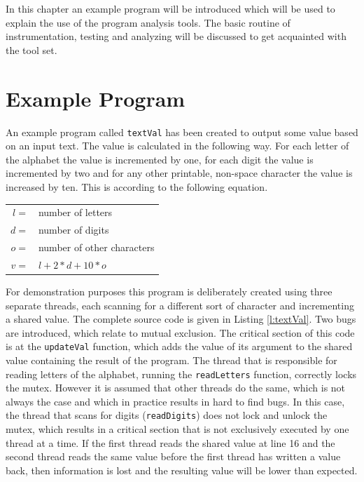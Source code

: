 
In this chapter an example program will be introduced
which will be used to explain the use of the program analysis tools.
The basic routine of instrumentation, testing and analyzing will be discussed
to get acquainted with the tool set.


\section{Example Program}
\label{s:exampleProgram}

An example program called \verb|textVal| has been created to output some value based on an input text.
The value is calculated in the following way. 
For each letter of the alphabet the value is incremented by one,
for each digit the value is incremented by two
and for any other printable, non-space character the value is increased by ten.
This is according to the following equation.
\begin{center}
\begin{tabular}{rl}
$l =$ & number of letters  \\
$d =$ & number of digits \\
$o =$ & number of other characters \\
$v =$ & $ l + 2*d + 10*o $ \\
\end{tabular}
\end{center}

For demonstration purposes this program is deliberately created using three separate threads,
each scanning for a different sort of character and incrementing a shared value.
The complete source code is given in Listing \ref{l:textVal}.
Two bugs are introduced, which relate to mutual exclusion.
The critical section of this code is at the \verb|updateVal| function,
which adds the value of its argument to the shared value containing the result of the program.
The thread that is responsible for reading letters of the alphabet,
running the \verb|readLetters| function,
correctly locks the mutex.
However it is assumed that other threads do the same,
which is not always the case and which in practice results in hard to find bugs.
In this case, the thread that scans for digits (\verb|readDigits|) does not lock and unlock the mutex,
which results in a critical section that is not exclusively executed by one thread at a time.
If the first thread reads the shared value at line 16 and 
the second thread reads the same value before the first thread has written a value back,
then information is lost and the resulting value will be lower than expected.

